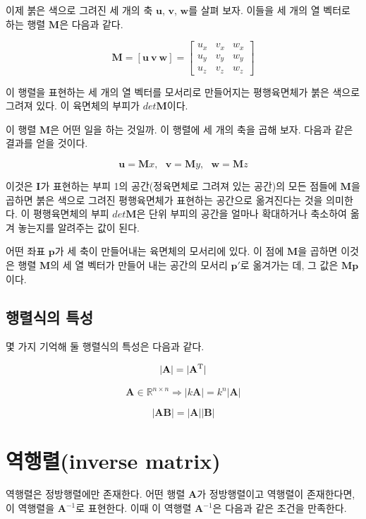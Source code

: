 이제 붉은 색으로 그려진 세 개의 축 $\mathbf u$, $\mathbf v$, $\mathbf w$를 살펴 보자.
이들을 세 개의 열 벡터로 하는 행렬 $\mathbf M$은 다음과 같다.

$$\mathbf M = \left [ \mathbf u ~ \mathbf v ~ \mathbf w \right ] =
\left [
\begin{array}{ccc}
u_x & v_x & w_x \\
u_y & v_y & w_y \\
u_z & v_z & w_z
\end{array}
\right ]
$$

이 행렬을 표현하는 세 개의 열 벡터를 모서리로 만들어지는 평행육면체가 붉은 색으로 그려져 있다.
이 육면체의 부피가 $det \mathbf M$이다.

이 행렬 $\mathbf M$은 어떤 일을 하는 것일까.
이 행렬에 세 개의 축을 곱해 보자. 다음과 같은 결과를 얻을 것이다.

$$\mathbf u = \mathbf M x, ~~~\mathbf v = \mathbf M y, ~~~\mathbf w = \mathbf M z$$

이것은 $\mathbf I$가 표현하는 부피 1의 공간(정육면체로 그려져 있는 공간)의 모든 점들에 $\mathbf M$을 곱하면
붉은 색으로 그려진 평행육면체가 표현하는 공간으로 옮겨진다는 것을 의미한다.
이 평행육면체의 부피 $det \mathbf M$은 단위 부피의 공간을 얼마나 확대하거나 축소하여 옮겨 놓는지를 알려주는 값이 된다.


어떤 좌표 $\mathbf p$가 세 축이 만들어내는 육면체의 모서리에 있다.
이 점에 $\mathbf M$을 곱하면 이것은 행렬 $\mathbf M$의 세 열 벡터가 만들어 내는 공간의 모서리 $\mathbf p'$로
옮겨가는 데, 그 값은 $\mathbf M \mathbf p$이다.


\subsection{행렬식의 특성}

몇 가지 기억해 둘 행렬식의 특성은 다음과 같다.

$$|\mathbf A| = |\mathbf A^{\rm T}|$$

$$\mathbf A \in \mathbb R^{n \times n} \Rightarrow | k \mathbf A | = k^n |\mathbf A|$$

$$|\mathbf {AB}| = |\mathbf A| |\mathbf B|$$

\section{역행렬(inverse matrix)}

역행렬은 정방행렬에만 존재한다. 어떤 행렬 $\mathbf A$가 정방행렬이고 역행렬이 존재한다면,
이 역행렬을 $\mathbf A^{-1}$로 표현한다. 이때 이 역행렬 $\mathbf A^{-1}$은 다음과 같은 조건을 만족한다.

